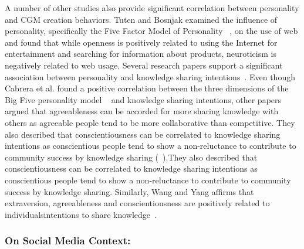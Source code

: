 A number of other studies also provide significant correlation between personality and CGM creation behaviors. Tuten and Bosnjak examined the influence of personality, specifically the Five Factor Model of Personality ~\cite{goldberg1990alternative}, on the use of web and found that while openness is positively related to using the Internet for entertainment and searching for information about products, neuroticism is negatively related to web usage. Several research papers support a significant association between personality and knowledge sharing intentions~\cite{cabrera2006determinants, wang2007personality, matzler2011personality, yoo2011influence}. Even though Cabrera et al. found a positive correlation between the three dimensions of the Big Five personality model ~\cite{goldberg1990alternative} and knowledge sharing intentions, other papers argued that agreeableness can be accorded for more sharing knowledge with others as agreeable people tend to be more collaborative than competitive. They also described that conscientiousness can be correlated to knowledge sharing intentions as conscientious people tend to show a non-reluctance to contribute to community success by knowledge sharing (~\cite{matzler2011personality, barrick1991big, liao2004multilevel}).They also described that conscientiousness can be correlated to knowledge sharing intentions as conscientious people tend to show a non-reluctance to contribute to community success by knowledge sharing. Similarly, Wang and Yang affirms that extraversion, agreeableness and conscientiousness are positively related to individuals\textquotesingle intentions to share knowledge~\cite{wang2007personality}.


\subsubsection{On Social Media Context: }\label{3.2}

